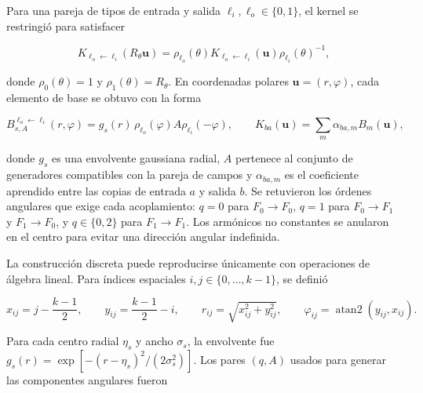 Para una pareja de tipos de entrada y salida \(\ell_i,\ell_o\in\{0,1\}\), el
kernel se restringió para satisfacer

\begin{equation}
    K_{\ell_o\leftarrow\ell_i}(R_\theta\mathbf{u})
    =\rho_{\ell_o}(\theta)
     K_{\ell_o\leftarrow\ell_i}(\mathbf{u})
     \rho_{\ell_i}(\theta)^{-1},
    \label{eq:restriccion-nucleo-so2}
\end{equation}

donde \(\rho_0(\theta)=1\) y \(\rho_1(\theta)=R_\theta\). En coordenadas
polares \(\mathbf{u}=(r,\varphi)\), cada elemento de base se obtuvo con la forma

\begin{equation}
    B_{s,A}^{\ell_o\leftarrow\ell_i}(r,\varphi)
    =g_s(r)\,\rho_{\ell_o}(\varphi)
      A\rho_{\ell_i}(-\varphi),
    \qquad
    K_{ba}(\mathbf{u})=\sum_m
      \alpha_{ba,m}B_m(\mathbf{u}),
    \label{eq:base-expansion-so2}
\end{equation}

donde \(g_s\) es una envolvente gaussiana radial, \(A\) pertenece al conjunto
de generadores compatibles con la pareja de campos y \(\alpha_{ba,m}\) es el
coeficiente aprendido entre las copias de entrada \(a\) y salida \(b\). Se
retuvieron los órdenes angulares que exige cada acoplamiento: \(q=0\) para
\(F_0\!\to F_0\), \(q=1\) para \(F_0\!\to F_1\) y
\(F_1\!\to F_0\), y \(q\in\{0,2\}\) para \(F_1\!\to F_1\). Los armónicos
no constantes se anularon en el centro para evitar una dirección angular
indefinida.

La construcción discreta puede reproducirse únicamente con operaciones de
álgebra lineal. Para índices espaciales \(i,j\in\{0,\ldots,k-1\}\), se definió

\begin{equation}
    x_{ij}=j-\frac{k-1}{2},\qquad
    y_{ij}=\frac{k-1}{2}-i,\qquad
    r_{ij}=\sqrt{x_{ij}^{2}+y_{ij}^{2}},\qquad
    \varphi_{ij}=\operatorname{atan2}(y_{ij},x_{ij}).
    \label{eq:cuadricula-kernel-so2}
\end{equation}

Para cada centro radial \(\eta_s\) y ancho \(\sigma_s\), la envolvente fue
\(g_s(r)=\exp[-(r-\eta_s)^2/(2\sigma_s^2)]\). Los pares
\((q,A)\) usados para generar las componentes angulares fueron

